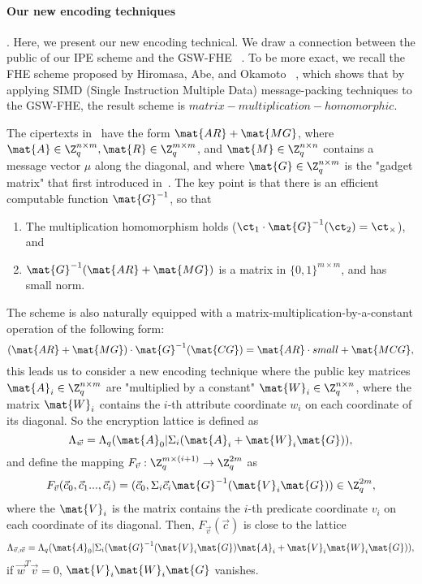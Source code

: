 \paragraph{Our new encoding techniques}. Here, we present our new encoding technical. We draw a connection between the public of our IPE scheme and the GSW-FHE~ \cite{C:GenSahWat13}. To be more exact, we recall the FHE scheme proposed by Hiromasa, Abe, and Okamoto~ \cite{PKC:HirAbeOka15}, which shows that by applying SIMD (Single Instruction Multiple Data) message-packing techniques to the GSW-FHE, the result scheme is $matrix-multiplication-homomorphic$.\

The cipertexts in~ \cite{PKC:HirAbeOka15} have the form $\mat{AR}+\mat{MG}$, where $\mat{A}\in \Z^{n \times m}_{q}, \mat{R}\in \Z^{m \times m}_{q}$, and $\mat{M}\in \Z^{n \times n}_{q}$ contains a message vector $\mu$ along the diagonal, and where $\mat{G}\in \Z^{n \times m}_{q}$ is the "gadget matrix" that first introduced in~\cite{EC:MicPei12}. The key point is that there is an efficient computable function $\mat{G}^{-1}$, so that
\begin{enumerate}
\item The multiplication homomorphism holds ($\ct_{1}\cdot \mat{G}^{-1}(\ct_{2})=\ct_{\times}$), and
\item $\mat{G}^{-1}(\mat{AR}+\mat{MG})$ is a matrix in $\{0,1\}^{m \times m}$, and has small norm.
\end{enumerate}
The scheme is also naturally equipped with a matrix-multiplication-by-a-constant operation of the following form:
$$(\mat{AR}+\mat{MG})\cdot \mat{G}^{-1}(\mat{CG})=\mat{AR}\cdot small+\mat{MCG},$$
this leads us to consider a new encoding technique where the public key matrices $\mat{A}_{i}\in \Z^{n \times m}_{q}$ are "multiplied by a constant" $\mat{W}_{i}\in \Z^{n \times n}_{q}$, where the matrix $\mat{W}_{i}$ contains the $i$-th attribute coordinate $w_{i}$ on each coordinate of its diagonal. So the encryption lattice is defined as
$$ \Lambda_{\vec{w}}=\Lambda_{q}(\mat{A}_{0}|\Sigma_{i} (\mat{A}_{i}+\mat{W}_{i}\mat{G})),$$
and define the mapping $F_{\vec{v}}: \Z^{m \times (i+1)}_{q} \rightarrow \Z^{2m}_{q}$ as
$$ F_{\vec{v}}(\vec{c}_{0},\vec{c}_{1}...,\vec{c}_{i})=(\vec{c}_{0},\Sigma_{i}\vec{c}_{i}\mat{G}^{-1}(\mat{V}_{i}\mat{G}))\in \Z^{2m}_{q},$$
where the $\mat{V}_{i}$ is the matrix contains the $i$-th predicate coordinate $v_{i}$ on each coordinate of its diagonal. Then, $F_{\vec{v}}(\vec{c})$ is close to the lattice
$$ \Lambda_{\vec{v},\vec{w}}=\Lambda_{q}(\mat{A}_{0}|\Sigma_{i}(\mat{G}^{-1}(\mat{V}_{i}\mat{G})\mat{A}_{i}+\mat{V}_{i}\mat{W}_{i}\mat{G})),$$
if $\vec{w}^{T}\vec{v}=0$, $\mat{V}_{i}\mat{W}_{i}\mat{G}$ vanishes.\

